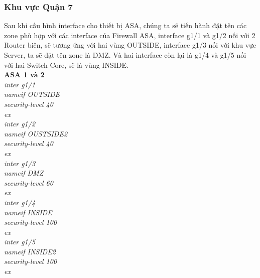 \documentclass[a4paper, 12pt]{article}
\begin{document}
\subsubsection{Khu vực Quận 7}
\hspace*{1cm}Sau khi cấu hình interface cho thiết bị ASA, chúng ta sẽ tiến hành đặt tên các zone phù hợp với các interface của Firewall ASA, interface g1/1 và g1/2 nối với 2 Router biên, sẽ tương ứng với hai vùng OUTSIDE, interface g1/3 nối với khu vực Server, ta sẽ đặt tên zone là DMZ. Và hai interface còn lại là g1/4 và g1/5 nối với hai Switch Core, sẽ là vùng INSIDE.\\
\hspace*{1cm}\textbf{ASA 1 và 2}\\
\hspace*{2cm}\textit{inter g1/1\\
\hspace*{2cm}nameif OUTSIDE\\
\hspace*{2cm}security-level 40\\
\hspace*{2cm}ex\\
\hspace*{2cm}inter g1/2\\
\hspace*{2cm}nameif OUSTSIDE2\\
\hspace*{2cm}security-level 40\\
\hspace*{2cm}ex\\
\hspace*{2cm}inter g1/3\\
\hspace*{2cm}nameif DMZ\\
\hspace*{2cm}security-level 60\\
\hspace*{2cm}ex\\
\hspace*{2cm}inter g1/4\\
\hspace*{2cm}nameif INSIDE\\
\hspace*{2cm}security-level 100\\
\hspace*{2cm}ex\\
\hspace*{2cm}inter g1/5\\
\hspace*{2cm}nameif INSIDE2\\
\hspace*{2cm}security-level 100\\
\hspace*{2cm}ex\\}
\end{document}
